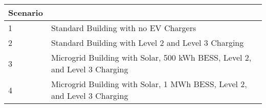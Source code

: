 \begin{tabularx}{\linewidth}{l | l}
\toprule
 Scenario &  \\
\midrule
		1  & Standard Building with no EV Chargers\\
        2 & Standard Building with Level 2 and Level 3 Charging\\
        3 & Microgrid Building with Solar, 500 kWh BESS, Level 2, and Level 3 Charging\\
        4 & Microgrid Building with Solar, 1 MWh BESS, Level 2, and Level 3 Charging\\
\bottomrule
\end{tabularx}
